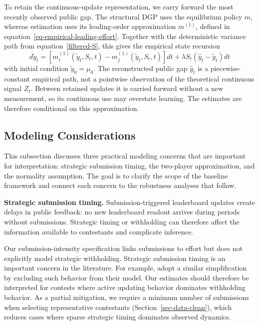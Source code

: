 \documentclass[mnsc]{informs3}
\begin{document}
{To retain the continuous-update representation, we carry forward the most recently observed public gap. The structural DGP uses the equilibrium policy $m$, whereas estimation uses its leading-order approximation $m^{(1)}$, defined in equation~\eqref{eq-empirical-leading-effort}. Together with the deterministic variance path from equation~\eqref{filtered-S}, this gives the empirical state recursion}
\begin{equation}\label{eq-filtered-y-update}
{d\tilde{y}_{t} = \left[m_i^{(1)}(\tilde{y}_t,S_t,t) - m_j^{(1)}(\tilde{y}_t,S_t,t)\right]dt + \lambda S_t(\hat{y}_t-\tilde{y}_{t}) dt}
\end{equation}
with initial condition $\tilde{y}_0 = \mu_0$.
The reconstructed public gap $\hat y_t$ is a piecewise-constant empirical path, not a pointwise observation of the theoretical continuous signal $Z_t$. Between retained updates it is carried forward without a new measurement, so its continuous use may overstate learning. The estimates are therefore conditional on this approximation.

\subsection{Modeling Considerations}\label{sect-concerns}

This subsection discusses three practical modeling concerns that are important for interpretation: strategic submission timing, the two-player approximation, and the normality assumption.
The goal is to clarify the scope of the baseline framework and connect each concern to the robustness analyses that follow.

\textbf{Strategic submission timing.}
Submission-triggered leaderboard updates create delays in public feedback: no new leaderboard readout arrives during periods without submissions. Strategic timing or withholding can therefore affect the information available to contestants and complicate inference.


Our submission-intensity specification links submissions to effort but does not explicitly model strategic withholding.
Strategic submission timing is an important concern in the literature.
For example, \citet{lemus2021dynamic} adopt a similar simplification by excluding such behavior from their model.
Our estimates should therefore be interpreted for contests where active updating behavior dominates withholding behavior.
As a partial mitigation, we require a minimum number of submissions when selecting representative contestants (Section~\ref{sec-data-clean}), which reduces cases where sparse strategic timing dominates observed dynamics.
\end{document}
